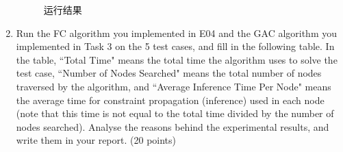 \documentclass{article}
\begin{document}
\begin{enumerate}
\begin{figure}[!h]
\end{figure}

\begin{figure}[!h]
    \centering
    \caption{运行结果}
\end{figure}


\item Run the FC algorithm you implemented in E04 and the GAC algorithm you implemented in Task 3 on the 5 test cases, and fill in the following table. In the table,
    ``Total Time" means the total time the algorithm uses to solve the test case,  ``Number of Nodes Searched" means the total number of nodes traversed by the algorithm, 
    and ``Average Inference Time Per Node" means the average time for constraint propagation (inference) 
used in each node (note that this time is not equal to the total time divided by the number of nodes searched). Analyse the reasons behind the experimental results, and write them in your report. (20 points)\\
  
\setlength{\tabcolsep}{2mm}{

}
\end{enumerate}
\end{document}
